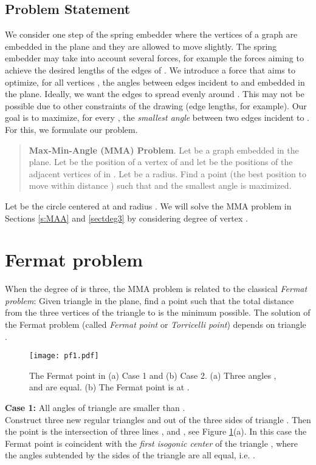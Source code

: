\documentclass[10pt]{article}
\begin{document}
\subsection{Problem Statement}

We consider one step of the spring embedder where the vertices of a
graph  are embedded in the plane and they are allowed to move
slightly. The spring embedder may take into account several forces,
for example the forces aiming to achieve the desired lengths of the edges
of . We introduce a force that aims to optimize, for all vertices
, the angles between edges incident to  and embedded in the
plane. Ideally, we want the edges to spread evenly around . This
may not be possible due to other constraints of the drawing (edge
lengths, for example). Our goal is to maximize, for every ,  the
{\em smallest angle} between two edges incident to . 
For this, we formulate our problem.

\begin{quote}
{\bf Max-Min-Angle (MMA) Problem}.
Let  be a graph embedded in the plane. Let  be the position
of a vertex  of  and let  be the positions of the adjacent
vertices of  in . Let  be a radius. Find a point  (the
best position to move  within distance ) such that 
and the smallest angle  is maximized.
\end{quote}

Let  be the circle centered at  and radius . 
We will solve the MMA problem in Sections \ref{s:MAA} and \ref{sectdeg3}
by considering degree  of vertex .

\section{Fermat problem} \label{s3}

When the degree of  is three, the MMA  problem is related to 
the classical {\em Fermat problem}: Given triangle  in the plane, find a point  such that the total distance from the three vertices of the triangle to  is the minimum possible. 
The solution of the Fermat problem (called {\em Fermat point} or {\em Torricelli point}) depends on triangle .

\begin{figure}[htp] 
\centering
\texttt{[image: pf1.pdf]}
\caption{The Fermat point  in (a) Case 1 and (b) Case 2.
(a) Three angles , and  are equal.
(b) The Fermat point is at .}
\label{pf1}
\end{figure}

 {\bf Case 1:}  All angles of triangle  are smaller than .\\
Construct three new regular triangles  and  out of the three sides of triangle .
Then the point  is the intersection of three lines , and , see Figure \ref{pf1}(a). 
In this case the Fermat point   is coincident with the {\em first isogonic center} 
of the triangle \cite{Eric}, where the angles subtended by the sides of the triangle are all equal, 
i.e.  .
\end{document}
